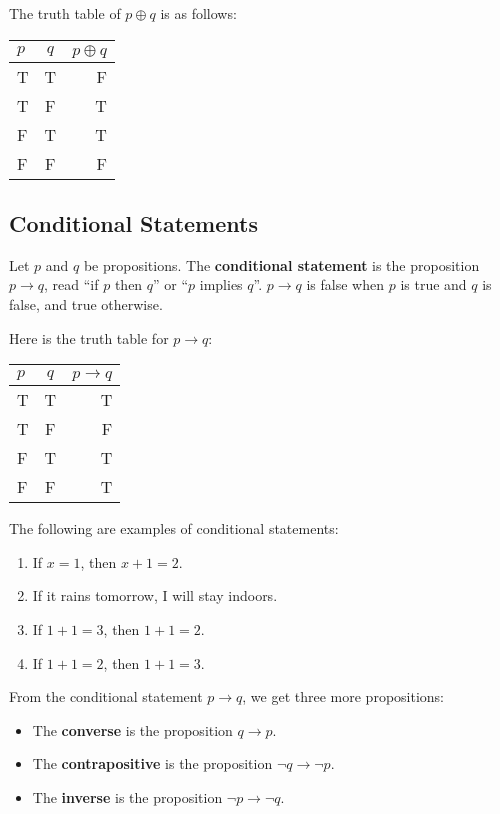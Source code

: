 The truth table of $p\oplus q$ is as follows:
\begin{table}[h] \centering
  \begin{tabular}{|l|c|r|}\hline
    $p$ & $q$ & $p\oplus q$ \\\hline
    T & T & F \\\hline
    T & F & T \\\hline
    F & T & T \\\hline
    F & F & F \\\hline
  \end{tabular}
\end{table}

\subsection{Conditional Statements}

\begin{defn} Let $p$ and $q$ be propositions. The \textbf{conditional
    statement} is the proposition $p\rightarrow q$, read ``if $p$ then
  $q$'' or ``$p$ implies $q$''. $p\rightarrow q$ is false when $p$ is true
  and $q$ is false, and true otherwise.
\end{defn}

Here is the truth table for $p\rightarrow q$:
\begin{table}[h] \centering
  \begin{tabular}{|l|c|r|}\hline
    $p$ & $q$ & $p\rightarrow q$ \\\hline
    T & T & T \\\hline
    T & F & F \\\hline
    F & T & T \\\hline
    F & F & T \\\hline
  \end{tabular}
\end{table}

\begin{example}
  The following are examples of conditional statements:
  \begin{enumerate}
  \item If $x=1$, then $x+1=2$.
  \item If it rains tomorrow, I will stay indoors.
  \item If $1+1=3$, then $1+1=2$.
  \item If $1+1=2$, then $1+1=3$.
  \end{enumerate}
\end{example}
  
From the conditional statement $p\rightarrow q$, we get three more
propositions:
\begin{itemize}
\item The \textbf{converse} is the proposition $q\rightarrow p$.
\item The \textbf{contrapositive} is the proposition
  $\neg q\rightarrow\neg p$.
\item The \textbf{inverse} is the proposition $\neg p\rightarrow \neg q$.
\end{itemize}

